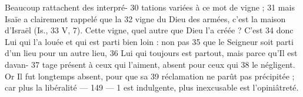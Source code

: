	Beaucoup rattachent des interpré-	 
30	 	tations variées à ce mot de vigne ;	 
31	 	mais Isaïe a clairement rappelé que la	 
32	 	vigne du Dieu des armées, c'est la maison d'Israël (Is.,	 
33	 	V, 7). Cette vigne, quel autre que Dieu l'a créée ? C'est	 
34	 	donc Lui qui l'a louée et qui est parti bien loin : non pas	 
35	 	que le Seigneur soit parti d'un lieu pour un autre lieu,	 
36	 	Lui qui toujours est partout, mais parce qu'Il est davan-	 
37	 	tage présent à ceux qui l'aiment, absent pour ceux qui	 
38	 	le négligent. Or Il fut longtemps absent, pour que sa	 
39	 	réclamation ne parût pas précipitée ; car plus la libéralité	 
 	--- 149 ---	 
1	 	est indulgente, plus inexcusable est l'opiniâtreté.